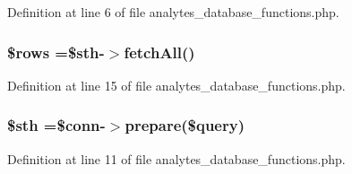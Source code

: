Definition at line 6 of file analytes\-\_\-database\-\_\-functions.\-php.

\hypertarget{analytes__database__functions_8php_ace2ec39e7df3899fa8df9640ec274b03}{
\subsubsection[{\$rows}]{\setlength{\rightskip}{0pt plus 5cm}\$rows =\$sth-\/$>$fetch\-All()}}\label{analytes__database__functions_8php_ace2ec39e7df3899fa8df9640ec274b03}


Definition at line 15 of file analytes\-\_\-database\-\_\-functions.\-php.

\hypertarget{analytes__database__functions_8php_afa9126f9664959c02795be300a135f93}{
\subsubsection[{\$sth}]{\setlength{\rightskip}{0pt plus 5cm}\$sth =\$conn-\/$>$prepare(\$query)}}\label{analytes__database__functions_8php_afa9126f9664959c02795be300a135f93}


Definition at line 11 of file analytes\-\_\-database\-\_\-functions.\-php.

